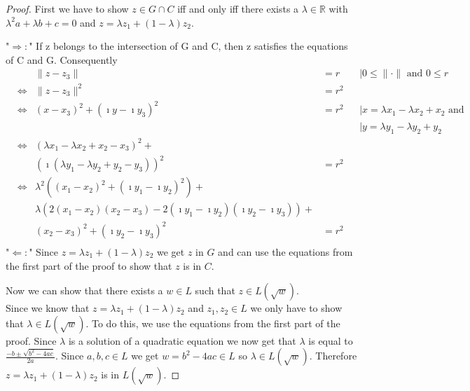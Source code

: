 \begin{proof}
First we have to show $z \in G \cap C$ iff and only iff there exists a $\lambda \in \mathbb{R}$ with $\lambda^2 a+ \lambda b + c = 0$ and $z = \lambda z_1 + (1-\lambda)z_2$.

"$\Rightarrow:$"  If z belongs to the intersection of G and C, then z satisfies the equations of C and G. Consequently
\begin{align*}
    &&\|z - z_3\| &= r &&\mid 0\le \|\cdot\|\text{ and }0\le r\\
    &\Leftrightarrow& \|z - z_3\|^2 &= r^2\\
    &\Leftrightarrow& (x - x_3)^2 + (\imath y - \imath y_3)^2 &= r^2 &&\mid x = \lambda x_1 - \lambda x_2 + x_2 \text{ and }\\ 
    &&&&&\mid y = \lambda y_1 - \lambda y_2 + y_2\\
    &\Leftrightarrow& (\lambda x_1 - \lambda x_2 + x_2 - x_3)^2 + \\
    &&(\imath (\lambda y_1 - \lambda y_2 + y_2 - y_3))^2 &= r^2\\
    &\Leftrightarrow& \lambda ^2 ((x_1 - x_2)^2 + (\imath y_1 - \imath y_2)^2) + \\
    &&\lambda (2(x_1 - x_2)(x_2 - x_3) - 2(\imath y_1 - \imath y_2)(\imath y_2 - \imath y_3)) + \\
    &&(x_2 - x_3)^2 + (\imath y_2 - \imath y_3)^2 &= r^2\\
\end{align*}
"$\Leftarrow:$" Since $z = \lambda z_1 + (1-\lambda)z_2$ we get $z$ in $G$ and can use the equations from the first part of the proof to show that $z$ is in $C$.

Now we can show that there exists a $w \in L$ such that $z \in L(\sqrt{w})$.\\
Since we know that $z = \lambda z_1 + (1-\lambda)z_2$ and $z_1, z_2 \in L$ we only have to show that $\lambda \in L(\sqrt{w})$.
To do this, we use the equations from the first part of the proof. 
Since $\lambda$ is a solution of a quadratic equation we now get that $\lambda$ is equal to $\frac{-b \pm \sqrt{b^2 - 4ac}}{2a}$. Since $a,b,c \in L$ we get $w = b^2 - 4ac \in L$ so $\lambda \in L(\sqrt{w})$. Therefore $z = \lambda z_1 + (1-\lambda)z_2$ is in $L(\sqrt{w})$.
\end{proof}
